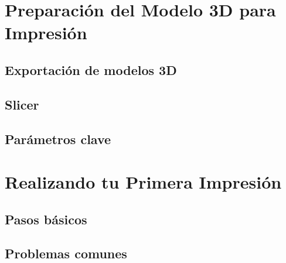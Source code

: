 \section{Preparación del Modelo 3D para Impresión}

\subsection{Exportación de modelos 3D}

\subsection{Slicer}

\subsection{Parámetros clave}

\section{Realizando tu Primera Impresión}

\subsection{Pasos básicos}

\subsection{Problemas comunes}

